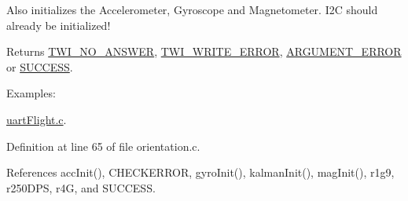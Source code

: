 Also initializes the Accelerometer, Gyroscope and Magnetometer. I2\-C should already be initialized! \begin{DoxyReturn}{Returns}
\hyperlink{group__error_gga2c3e4bb40f36b262a5214e2da2bca9c5a04d5943ba652af2205c88b247e0c659c}{T\-W\-I\-\_\-\-N\-O\-\_\-\-A\-N\-S\-W\-E\-R}, \hyperlink{group__error_gga2c3e4bb40f36b262a5214e2da2bca9c5ac0e3b3463dcaf220e54794b4711708c9}{T\-W\-I\-\_\-\-W\-R\-I\-T\-E\-\_\-\-E\-R\-R\-O\-R}, \hyperlink{group__error_gga2c3e4bb40f36b262a5214e2da2bca9c5a49ccf277a69dd938c591928aa27c66cc}{A\-R\-G\-U\-M\-E\-N\-T\-\_\-\-E\-R\-R\-O\-R} or \hyperlink{group__error_gga2c3e4bb40f36b262a5214e2da2bca9c5ac7f69f7c9e5aea9b8f54cf02870e2bf8}{S\-U\-C\-C\-E\-S\-S}. 
\end{DoxyReturn}
\begin{Desc}
\item[Examples\-: ]\par
\hyperlink{uart_flight_8c-example}{uart\-Flight.\-c}.\end{Desc}


Definition at line 65 of file orientation.\-c.



References acc\-Init(), C\-H\-E\-C\-K\-E\-R\-R\-O\-R, gyro\-Init(), kalman\-Init(), mag\-Init(), r1g9, r250\-D\-P\-S, r4\-G, and S\-U\-C\-C\-E\-S\-S.


